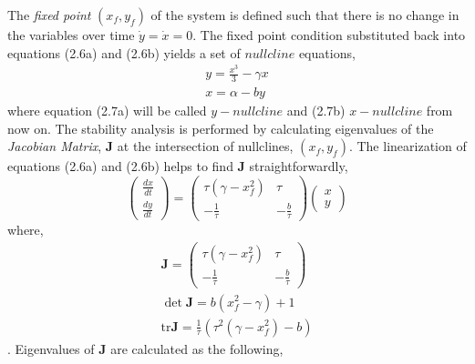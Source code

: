 The \textit{fixed point} $(x_f, y_f)$ of the system is defined such that there is no change in the variables over time $\dot{y} =\dot{x} = 0 $. The fixed point condition substituted back into equations (2.6a) and (2.6b) yields a set of $nullcline$ equations, 
\begin{subequations}
\begin{align}  y = \frac{x^3}{3} - \gamma x
              \label{eqn: frobenius 3}\\  
               x = \alpha - b y
               \label{eqn: frobenius 4}   \end{align} 
\end{subequations}
where equation (2.7a) will be called $y-nullcline$ and (2.7b) $x-nullcline$ from now on. The stability analysis is performed by calculating eigenvalues of the \textit{Jacobian Matrix}, \textbf{J} at the intersection of nullclines, $(x_f, y_f)$. The  linearization of equations (2.6a) and (2.6b) helps to find  \textbf{J} straightforwardly,
\begin{equation}
%
    \begin{pmatrix}
        \frac{dx}{dt} \\ \frac{dy}{dt}
     \end{pmatrix} = \begin{pmatrix}
        \tau(\gamma - x_f^2) & \tau \\
        -\frac{1}{\tau}     & -\frac{b}{\tau}
     \end{pmatrix}
    \begin{pmatrix}
        x \\
        y
    \end{pmatrix}
%
\end{equation}
where,
\begin{subequations}
\begin{align} \textbf{J} = \begin{pmatrix} \tau(\gamma - x_f^2) & \tau \\ -\frac{1}{\tau}     & -\frac{b}{\tau}   \end{pmatrix}
              \label{eqn: frobenius 5}\\  
 \det \textbf{J} =  b(x_f^2 - \gamma) +1
               \label{eqn: frobenius 6} \\   
\mathrm{tr} \textbf{J} =  \frac{1}{\tau}(\tau^2( \gamma - x_f^2 ) -b)
               \label{eqn: frobenius 7}                 
               \end{align} 
\end{subequations}
. Eigenvalues of \textbf{J} are calculated as the following,

